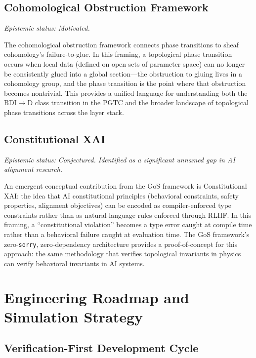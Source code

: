 \documentclass[12pt,letterpaper]{report}
\newcommand{\epistemic}[1]{%
  \par\vspace{4pt}%
  {\small\itshape\color{gray} Epistemic status: #1}%
  \par\vspace{4pt}%
}
\begin{document}
\section{Cohomological Obstruction Framework}

\epistemic{Motivated.}

The cohomological obstruction framework connects phase transitions to sheaf cohomology's failure-to-glue. In this framing, a topological phase transition occurs when local data (defined on open sets of parameter space) can no longer be consistently glued into a global section---the obstruction to gluing lives in a cohomology group, and the phase transition is the point where that obstruction becomes nontrivial. This provides a unified language for understanding both the BDI$\to$D class transition in the PGTC and the broader landscape of topological phase transitions across the layer stack.

\section{Constitutional XAI}

\epistemic{Conjectured. Identified as a significant unnamed gap in AI alignment research.}

An emergent conceptual contribution from the GoS framework is Constitutional XAI: the idea that AI constitutional principles (behavioral constraints, safety properties, alignment objectives) can be encoded as compiler-enforced type constraints rather than as natural-language rules enforced through RLHF. In this framing, a ``constitutional violation'' becomes a type error caught at compile time rather than a behavioral failure caught at evaluation time. The GoS framework's zero-\texttt{sorry}, zero-dependency architecture provides a proof-of-concept for this approach: the same methodology that verifies topological invariants in physics can verify behavioral invariants in AI systems.



\chapter{Engineering Roadmap and Simulation Strategy}

\section{Verification-First Development Cycle}
\end{document}
